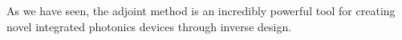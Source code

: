 
As we have seen, the adjoint method is an incredibly powerful tool for creating novel integrated photonics devices through inverse design.
